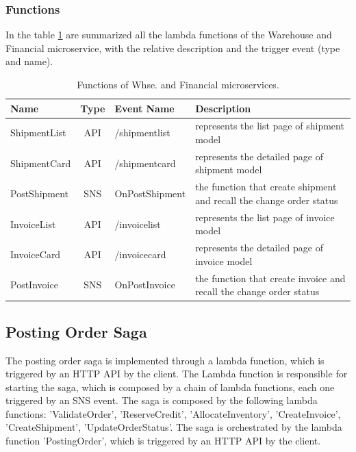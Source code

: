 \subsubsection{Functions}
In the table \ref{tab:5_whse_financial_functions} are summarized all the lambda functions of the Warehouse
and Financial microservice, with the relative description and the trigger event (type and name).

\begin{table}
    \centering
    \begin{tabular}{|l|c|l|m{6cm}|}
        \hline
        \textbf{Name} & \textbf{Type} & \textbf{Event Name} & \textbf{Description}                                                 \\ \hline
        ShipmentList  & API           & /shipmentlist       & represents the list page of shipment model                           \\ \hline
        ShipmentCard  & API           & /shipmentcard       & represents the detailed page of shipment model                       \\ \hline
        PostShipment  & SNS           & OnPostShipment      & the function that create shipment and recall the change order status \\ \hline
        InvoiceList   & API           & /invoicelist        & represents the list page of invoice model                            \\ \hline
        InvoiceCard   & API           & /invoicecard        & represents the detailed page of invoice model                        \\ \hline
        PostInvoice   & SNS           & OnPostInvoice       & the function that create invoice and recall the change order status  \\ \hline
    \end{tabular}
    \caption{Functions of Whse. and Financial microservices.}
    \label{tab:5_whse_financial_functions}
\end{table}

\subsection{Posting Order Saga}
The posting order saga is implemented through a lambda function, which is
triggered by an HTTP API by the client. The Lambda function is responsible for starting the saga, which is composed
by a chain of lambda functions, each one triggered by an SNS event. The saga is composed by the following lambda
functions: 'ValidateOrder', 'ReserveCredit', 'AllocateInventory', 'CreateInvoice', 'CreateShipment', 'UpdateOrderStatus'.
The saga is orchestrated by the lambda function 'PostingOrder', which is triggered by an HTTP API by the client.


